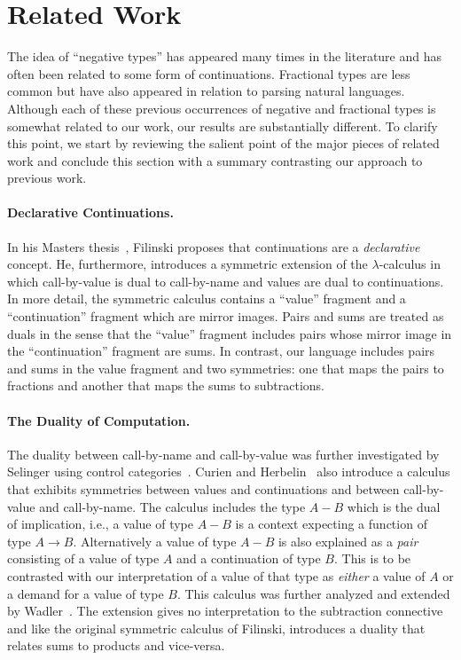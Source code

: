 \documentclass[preprint]{sigplanconf}
\begin{document}
\section{Related Work} 
\label{sec:related}

The idea of ``negative types'' has appeared many times in the literature and
has often been related to some form of continuations. Fractional types are
less common but have also appeared in relation to parsing natural
languages. Although each of these previous occurrences of negative and
fractional types is somewhat related to our work, our results are
substantially different. To clarify this point, we start by reviewing the
salient point of the major pieces of related work and conclude this section
with a summary contrasting our approach to previous work.

\paragraph*{Declarative Continuations.} 
In his Masters thesis~\cite{Filinski:1989:DCI:648332.755574}, Filinski
proposes that continuations are a \emph{declarative} concept. He,
furthermore, introduces a symmetric extension of the $\lambda$-calculus in
which call-by-value is dual to call-by-name and values are dual to
continuations. In more detail, the symmetric calculus contains a ``value''
fragment and a ``continuation'' fragment which are mirror images. Pairs and
sums are treated as duals in the sense that the ``value'' fragment includes
pairs whose mirror image in the ``continuation'' fragment are sums. In
contrast, our language includes pairs and sums in the value fragment and two
symmetries: one that maps the pairs to fractions and another that maps the
sums to subtractions.

\paragraph*{The Duality of Computation.}
The duality between call-by-name and call-by-value was further investigated
by Selinger using control
categories~\cite{Selinger:2001:CCD:966910.966911}. Curien and
Herbelin~\cite{Curien:2000} also introduce a calculus that exhibits
symmetries between values and continuations and between call-by-value and
call-by-name. The calculus includes the type $A-B$ which is the dual of
implication, i.e., a value of type $A-B$ is a context expecting a function of
type $A \rightarrow B$. Alternatively a value of type $A-B$ is also explained
as a \emph{pair} consisting of a value of type $A$ and a continuation of type
$B$. This is to be contrasted with our interpretation of a value of that type
as \emph{either} a value of $A$ or a demand for a value of type $B$. This
calculus was further analyzed and extended by
Wadler~\cite{Wadler:2003,DBLP:conf/rta/Wadler05}. The extension gives no
interpretation to the subtraction connective and like the original symmetric
calculus of Filinski, introduces a duality that relates sums to products and
vice-versa.
\end{document}
